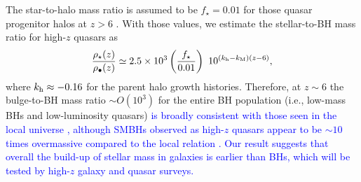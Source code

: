 \documentclass[twocolumn, twocolappendix]{aastex63}
\newcommand{\Msunyr}{M_\odot~{\rm yr}^{-1}}
\newcommand{\Mh}{M_\mathrm{h}}
\newcommand{\D}{\mathrm{d}}
\newcommand{\red}[1]{\textcolor{red}{ #1}}
\newcommand{\blue}[1]{\textcolor{blue}{ #1}}
\begin{document}
\begin{CJK*}{UTF8}{gbsn}

The star-to-halo mass ratio is assumed to be $f_\star =0.01$ for those quasar progenitor halos at $z>6$
\citep[fits by code {\tt UNIVERSEMACHINE} in][]{2019MNRAS.488.3143B}.
With those values, we estimate the stellar-to-BH mass ratio for high-$z$ quasars as
%
\begin{equation}
\frac{\rho_{\star}(z)}{\rho_{\bullet}(z)}
\simeq 2.5\times 10^{3} \left(\frac{f_\star}{0.01}\right)
~ 10^{(k_{\rm h}-k_{\rm M})(z-6)},
\end{equation}
% 
where $k_{\rm h} \approx -0.16 $ for the parent halo growth histories.
Therefore, at $z\sim 6$ the bulge-to-BH mass ratio $\sim O(10^3)$ for the entire BH population (i.e., low-mass BHs and low-luminosity quasars) 
\blue{
is broadly consistent with those seen in the local universe \citep[$\simeq 200-1000$ in e.g.,][]{2012ApJ...751L..25V,2013ARA&A..51..511K},
although SMBHs observed as high-$z$ quasars appear to be $\sim 10$ times overmassive compared to the local relation 
\citep[e.g.,][]{2013ApJ...773...44W,2020A&A...637A..84P,2021ApJ...911..141N}.
Our result suggests that overall the build-up of stellar mass in galaxies is earlier than BHs,
which will be tested by high-$z$ galaxy and quasar surveys.
}


\end{CJK*}
\end{document}
